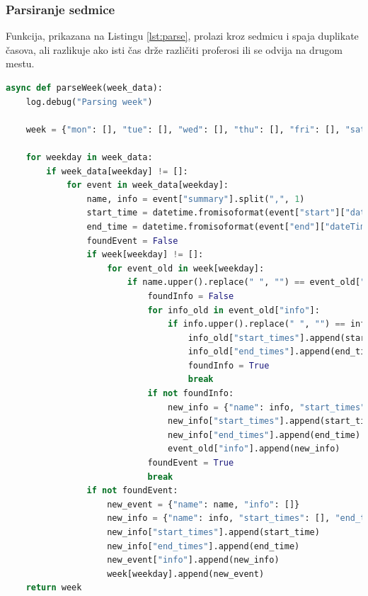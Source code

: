 \documentclass[a4paper,11pt]{article}
\begin{document}
\subsubsection{Parsiranje sedmice}
Funkcija, prikazana na Listingu \ref{lst:parse}, prolazi kroz sedmicu i spaja duplikate časova, ali razlikuje ako isti čas drže različiti proferosi ili se odvija na drugom mestu.
\begin{lstlisting}[language=Python, caption=Parsiranje sedmice, label=lst:parse]
async def parseWeek(week_data):
    log.debug("Parsing week")

    week = {"mon": [], "tue": [], "wed": [], "thu": [], "fri": [], "sat": [], "sun": []}

    for weekday in week_data:
        if week_data[weekday] != []:
            for event in week_data[weekday]:
                name, info = event["summary"].split(",", 1)
                start_time = datetime.fromisoformat(event["start"]["dateTime"]).strftime("%H:%M")
                end_time = datetime.fromisoformat(event["end"]["dateTime"]).strftime("%H:%M")
                foundEvent = False
                if week[weekday] != []:
                    for event_old in week[weekday]:
                        if name.upper().replace(" ", "") == event_old["name"].upper().replace(" ", ""):
                            foundInfo = False
                            for info_old in event_old["info"]:
                                if info.upper().replace(" ", "") == info_old["name"].upper().replace(" ", ""):
                                    info_old["start_times"].append(start_time)
                                    info_old["end_times"].append(end_time)
                                    foundInfo = True
                                    break
                            if not foundInfo:
                                new_info = {"name": info, "start_times": [], "end_times": []}
                                new_info["start_times"].append(start_time)
                                new_info["end_times"].append(end_time)
                                event_old["info"].append(new_info)
                            foundEvent = True
                            break
                if not foundEvent:
                    new_event = {"name": name, "info": []}
                    new_info = {"name": info, "start_times": [], "end_times": []}
                    new_info["start_times"].append(start_time)
                    new_info["end_times"].append(end_time)
                    new_event["info"].append(new_info)
                    week[weekday].append(new_event)
    return week
\end{lstlisting}
\newpage
\end{document}
